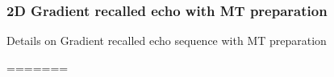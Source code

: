 \subsubsection{2D Gradient recalled echo with MT preparation}
\begin{table}[H]
\caption{Details on Gradient recalled echo sequence with MT preparation}
\small
=======


\end{table}
